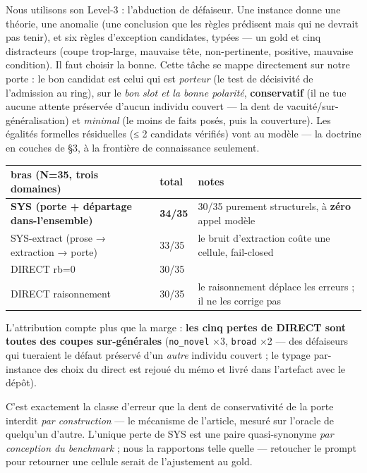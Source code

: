\documentclass[11pt]{article}
\begin{document}
Nous utilisons son Level-3 : l'abduction de défaiseur. Une instance donne une théorie, une anomalie (une conclusion que les règles prédisent mais qui ne devrait pas tenir), et six règles d'exception candidates, typées — un gold et cinq distracteurs (coupe trop-large, mauvaise tête, non-pertinente, positive, mauvaise condition). Il faut choisir la bonne. Cette tâche se mappe directement sur notre porte : le bon candidat est celui qui est \emph{porteur} (le test de décisivité de l'admission au ring), sur le \emph{bon slot et la bonne polarité}, \textbf{conservatif} (il ne tue aucune attente préservée d'aucun individu couvert — la dent de vacuité/sur-généralisation) et \emph{minimal} (le moins de faits posés, puis la couverture). Les égalités formelles résiduelles (≤ 2 candidats vérifiés) vont au modèle — la doctrine en couches de §3, à la frontière de connaissance seulement.

\begin{center}\small\begin{tabular}{lll}\toprule
bras (N=35, trois domaines) & total & notes \\ \midrule
\textbf{SYS (porte + départage dans-l'ensemble)} & \textbf{34/35} & 30/35 purement structurels, à \textbf{zéro} appel modèle \\
SYS-extract (prose → extraction → porte) & 33/35 & le bruit d'extraction coûte une cellule, fail-closed \\
DIRECT rb=0 & 30/35 &  \\
DIRECT raisonnement & 30/35 & le raisonnement déplace les erreurs ; il ne les corrige pas \\
\bottomrule\end{tabular}\end{center}

L'attribution compte plus que la marge : \textbf{les cinq pertes de DIRECT sont toutes des coupes sur-générales} (\texttt{no\_novel} ×3, \texttt{broad} ×2 — des défaiseurs qui tueraient le défaut préservé d'un \emph{autre} individu couvert ; le typage par-instance des choix du direct est rejoué du mémo et livré dans l'artefact avec le dépôt).

C'est exactement la classe d'erreur que la dent de conservativité de la porte interdit \emph{par construction} — le mécanisme de l'article, mesuré sur l'oracle de quelqu'un d'autre. L'unique perte de SYS est une paire quasi-synonyme \emph{par conception du benchmark} ; nous la rapportons telle quelle — retoucher le prompt pour retourner une cellule serait de l'ajustement au gold.
\end{document}
